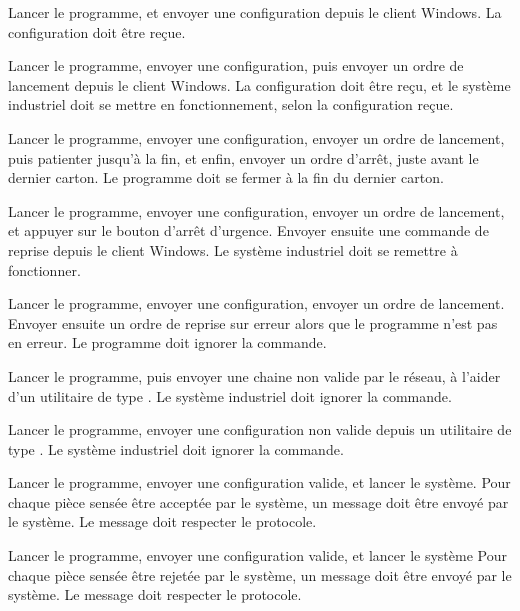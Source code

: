 {Lancer le programme, et envoyer une configuration depuis le client Windows.}
{La configuration doit être reçue.}

{Lancer le programme, envoyer une configuration, puis envoyer un ordre de
lancement depuis le client Windows.}
{La configuration doit être reçu, et le système industriel doit se mettre en
fonctionnement, selon la configuration reçue.}

{Lancer le programme, envoyer une configuration, envoyer un ordre de lancement,
puis patienter jusqu'à la fin, et enfin, envoyer un ordre d'arrêt, juste
avant le dernier carton.}
{Le programme doit se fermer à la fin du dernier carton.}

{Lancer le programme, envoyer une configuration, envoyer un ordre de lancement,
et appuyer sur le bouton d'arrêt d'urgence. Envoyer ensuite une commande de
    reprise depuis le client Windows.}
{Le système industriel doit se remettre à fonctionner.}

{Lancer le programme, envoyer une configuration, envoyer un ordre de lancement.
Envoyer ensuite un ordre de reprise sur erreur alors que le programme n'est pas
en erreur.}
{Le programme doit ignorer la commande.}

{Lancer le programme, puis envoyer une chaine non valide par le réseau, à
    l'aider d'un utilitaire de type .}
{Le système industriel doit ignorer la commande.}

{Lancer le programme, envoyer une configuration non valide depuis un utilitaire
    de type .}
{Le système industriel doit ignorer la commande.}

{Lancer le programme, envoyer une configuration valide, et lancer le système.}
{Pour chaque pièce sensée être acceptée par le système, un message doit être
    envoyé par le système. Le message doit respecter le protocole.}

{Lancer le programme, envoyer une configuration valide, et lancer le système}
{Pour chaque pièce sensée être rejetée par le système, un message doit être
envoyé par le système. Le message doit respecter le protocole.}

